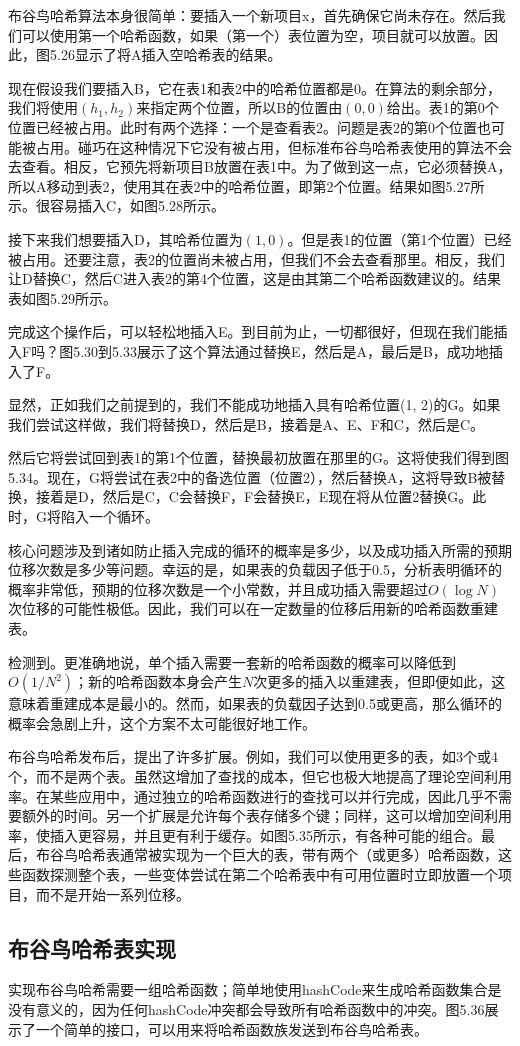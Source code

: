 \documentclass[a4paper]{ctexart}
\theoremstyle{definition}
\theoremstyle{definition}
\begin{document}
布谷鸟哈希算法本身很简单：要插入一个新项目x，首先确保它尚未存在。然后我们可以使用第一个哈希函数，如果（第一个）表位置为空，项目就可以放置。因此，图5.26显示了将A插入空哈希表的结果。

现在假设我们要插入B，它在表1和表2中的哈希位置都是0。在算法的剩余部分，我们将使用\( (h_1, h_2) \)来指定两个位置，所以B的位置由\( (0,0) \)给出。表1的第0个位置已经被占用。此时有两个选择：一个是查看表2。问题是表2的第0个位置也可能被占用。碰巧在这种情况下它没有被占用，但标准布谷鸟哈希表使用的算法不会去查看。相反，它预先将新项目B放置在表1中。为了做到这一点，它必须替换A，所以A移动到表2，使用其在表2中的哈希位置，即第2个位置。结果如图5.27所示。很容易插入C，如图5.28所示。

接下来我们想要插入D，其哈希位置为\( (1, 0) \)。但是表1的位置（第1个位置）已经被占用。还要注意，表2的位置尚未被占用，但我们不会去查看那里。相反，我们让D替换C，然后C进入表2的第4个位置，这是由其第二个哈希函数建议的。结果表如图5.29所示。

完成这个操作后，可以轻松地插入E。到目前为止，一切都很好，但现在我们能插入F吗？图5.30到5.33展示了这个算法通过替换E，然后是A，最后是B，成功地插入了F。

显然，正如我们之前提到的，我们不能成功地插入具有哈希位置(1, 2)的G。如果我们尝试这样做，我们将替换D，然后是B，接着是A、E、F和C，然后是C。

然后它将尝试回到表1的第1个位置，替换最初放置在那里的G。这将使我们得到图5.34。现在，G将尝试在表2中的备选位置（位置2），然后替换A，这将导致B被替换，接着是D，然后是C，C会替换F，F会替换E，E现在将从位置2替换G。此时，G将陷入一个循环。

核心问题涉及到诸如防止插入完成的循环的概率是多少，以及成功插入所需的预期位移次数是多少等问题。幸运的是，如果表的负载因子低于0.5，分析表明循环的概率非常低，预期的位移次数是一个小常数，并且成功插入需要超过\( O(\log N) \)次位移的可能性极低。因此，我们可以在一定数量的位移后用新的哈希函数重建表。

检测到。更准确地说，单个插入需要一套新的哈希函数的概率可以降低到\( O(1/N^2) \)；新的哈希函数本身会产生\( N \)次更多的插入以重建表，但即便如此，这意味着重建成本是最小的。然而，如果表的负载因子达到0.5或更高，那么循环的概率会急剧上升，这个方案不太可能很好地工作。

布谷鸟哈希发布后，提出了许多扩展。例如，我们可以使用更多的表，如3个或4个，而不是两个表。虽然这增加了查找的成本，但它也极大地提高了理论空间利用率。在某些应用中，通过独立的哈希函数进行的查找可以并行完成，因此几乎不需要额外的时间。另一个扩展是允许每个表存储多个键；同样，这可以增加空间利用率，使插入更容易，并且更有利于缓存。如图5.35所示，有各种可能的组合。最后，布谷鸟哈希表通常被实现为一个巨大的表，带有两个（或更多）哈希函数，这些函数探测整个表，一些变体尝试在第二个哈希表中有可用位置时立即放置一个项目，而不是开始一系列位移。

\subsection*{布谷鸟哈希表实现}

实现布谷鸟哈希需要一组哈希函数；简单地使用hashCode来生成哈希函数集合是没有意义的，因为任何hashCode冲突都会导致所有哈希函数中的冲突。图5.36展示了一个简单的接口，可以用来将哈希函数族发送到布谷鸟哈希表。



\end{document}
